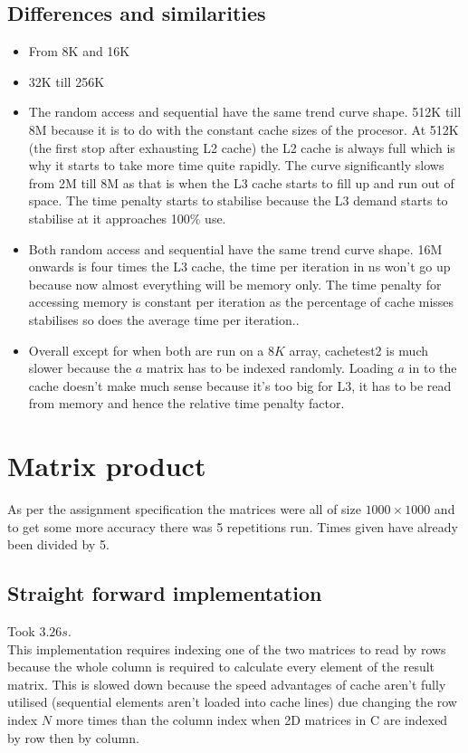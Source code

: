 \documentclass[10pt,a4paper]{article}
\begin{document}
    \subsection{Differences and similarities}
    \begin{itemize}
        \item From 8K and 16K
        \item 32K till 256K
        \item The random access and sequential have the same trend curve shape. 512K till 8M because it is to do with the constant cache sizes of the procesor. At 512K (the first stop after exhausting L2 cache) the L2 cache is always full which is why it starts to take more time quite rapidly. The curve significantly slows from 2M till 8M as that is when the L3 cache starts to fill up and run out of space. The time penalty starts to stabilise because the L3 demand starts to stabilise at it approaches 100\% use.
        \item Both random access and sequential have the same trend curve shape. 16M onwards is four times the L3 cache, the time per iteration in ns won't go up because now almost everything will be memory only. The time penalty for accessing memory is constant per iteration as the percentage of cache misses stabilises so does the average time per iteration..
        \item Overall except for when both are run on a $8K$ array, cachetest2 is much slower because the $a$ matrix has to be indexed randomly. Loading $a$ in to the cache doesn't make much sense because it's too big for L3, it has to be read from memory and hence the relative time penalty factor.
    \end{itemize}

    \section{Matrix product}
    As per the assignment specification the matrices were all of size $1000\times1000$ and to get some more accuracy there was 5 repetitions run. Times given have already been divided by 5.
    \subsection{Straight forward implementation}
    Took $3.26s$.\\
    This implementation requires indexing one of the two matrices to read by rows because the whole column is required to calculate every element of the result matrix. This is slowed down because the speed advantages of cache aren't fully utilised (sequential elements aren't loaded into cache lines) due changing the row index $N$ more times than the column index when 2D matrices in C are indexed by row then by column. \\
\end{document}
